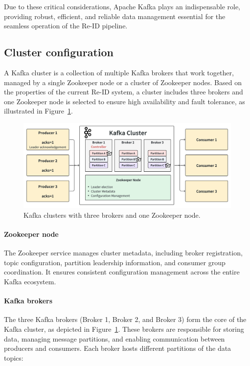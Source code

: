 Due to these critical considerations, Apache Kafka plays an indispensable role, providing robust, efficient, and reliable data management essential for the seamless operation of the Re-ID pipeline.

\subsection{Cluster configuration}

A Kafka cluster is a collection of multiple Kafka brokers that work together, managed by a single Zookeeper node or a cluster of Zookeeper nodes. Based on the properties of the current Re-ID system, a cluster includes three brokers and one Zookeeper node is selected to ensure high availability and fault tolerance, as illustrated in Figure~\ref{fig:kafka_cluster}.

\begin{figure}[htbp]
    \centering
    \includegraphics[width=1\textwidth]{Figure/kafka_overview.png}
    \caption{Kafka clusters with three brokers and one Zookeeper node.}
    \label{fig:kafka_cluster}
\end{figure}

\paragraph{Zookeeper node}

The Zookeeper service manages cluster metadata, including broker registration, topic configuration, partition leadership information, and consumer group coordination. It ensures consistent configuration management across the entire Kafka ecosystem.

\paragraph{Kafka brokers}

The three Kafka brokers (Broker 1, Broker 2, and Broker 3) form the core of the Kafka cluster, as depicted in Figure~\ref{fig:kafka_cluster}. These brokers are responsible for storing data, managing message partitions, and enabling communication between producers and consumers. Each broker hosts different partitions of the data topics:

